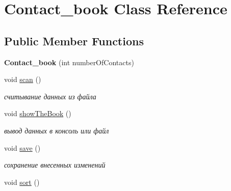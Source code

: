 \hypertarget{class_contact__book}{}\section{Contact\+\_\+book Class Reference}
\label{class_contact__book}
\subsection*{Public Member Functions}
\begin{DoxyCompactItemize}
\item 
{\bfseries Contact\+\_\+book} (int number\+Of\+Contacts)\hypertarget{class_contact__book_a493878cbacfdf50404696bb746760487}{}\label{class_contact__book_a493878cbacfdf50404696bb746760487}

\item 
void \hyperlink{class_contact__book_a2c9537efdf0000c74cbb5b18201374df}{scan} ()\hypertarget{class_contact__book_a2c9537efdf0000c74cbb5b18201374df}{}\label{class_contact__book_a2c9537efdf0000c74cbb5b18201374df}

\begin{DoxyCompactList}\small\item\em считывание данных из файла \end{DoxyCompactList}\item 
void \hyperlink{class_contact__book_a6e7ab08bee5a71aef81695eba7287aad}{show\+The\+Book} ()\hypertarget{class_contact__book_a6e7ab08bee5a71aef81695eba7287aad}{}\label{class_contact__book_a6e7ab08bee5a71aef81695eba7287aad}

\begin{DoxyCompactList}\small\item\em вывод данных в консоль или файл \end{DoxyCompactList}\item 
void \hyperlink{class_contact__book_aec5384ee6d83a0193c8f0893be897fe2}{save} ()\hypertarget{class_contact__book_aec5384ee6d83a0193c8f0893be897fe2}{}\label{class_contact__book_aec5384ee6d83a0193c8f0893be897fe2}

\begin{DoxyCompactList}\small\item\em сохранение внесенных изменений \end{DoxyCompactList}\item 
void \hyperlink{class_contact__book_af184bfa058b796b122989d060a6cf9f4}{sort} ()\hypertarget{class_contact__book_af184bfa058b796b122989d060a6cf9f4}{}\label{class_contact__book_af184bfa058b796b122989d060a6cf9f4}


\end{DoxyCompactItemize}
